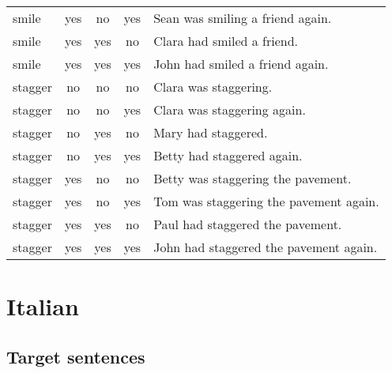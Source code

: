 \begin{longtable}{l|ccc|p{5cm}}
smile   & yes  & no   & yes  & Sean was smiling a friend again.       \\
smile   & yes  & yes  & no   & Clara had smiled a friend.             \\
smile   & yes  & yes  & yes  & John had smiled a friend again.        \\
stagger & no   & no   & no   & Clara was staggering.                  \\
stagger & no   & no   & yes  & Clara was staggering again.            \\
stagger & no   & yes  & no   & Mary had staggered.                    \\
stagger & no   & yes  & yes  & Betty had staggered again.             \\
stagger & yes  & no   & no   & Betty was staggering the pavement.     \\
stagger & yes  & no   & yes  & Tom was staggering the pavement again. \\
stagger & yes  & yes  & no   & Paul had staggered the pavement.       \\
stagger & yes  & yes  & yes  & John had staggered the pavement again.
\end{longtable}


\section{Italian}

\subsection{Target sentences}

